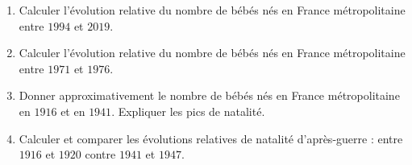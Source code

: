 \documentclass[a4paper, 14pt]{extarticle}
\theoremstyle{plain}
\theoremstyle{definition}
\begin{document}
{\begin{enumerate}
		\item Calculer l'évolution relative du nombre de bébés nés en France métropolitaine entre $1994$ et $2019$.
		
		\item Calculer l'évolution relative du nombre de bébés nés en France métropolitaine entre $1971$ et $1976$.
		
		\item Donner approximativement le nombre de bébés nés en France métropolitaine en $1916$ et en $1941$. Expliquer les pics de natalité.
		
		\item Calculer et comparer les évolutions relatives de natalité d'après-guerre : entre $1916$ et $1920$ contre $1941$ et $1947$.
	\end{enumerate}
}{}

\newpage
\end{document}
